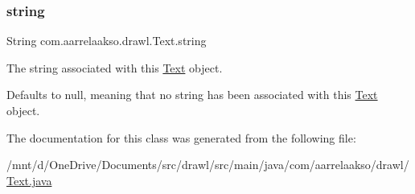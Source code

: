 \subsubsection{\texorpdfstring{string}{string}}
{\footnotesize\ttfamily String com.\+aarrelaakso.\+drawl.\+Text.\+string\hspace{0.3cm}{\ttfamily [private]}}



The string associated with this \hyperlink{classcom_1_1aarrelaakso_1_1drawl_1_1_text}{Text} object. 

Defaults to {\ttfamily null}, meaning that no string has been associated with this \hyperlink{classcom_1_1aarrelaakso_1_1drawl_1_1_text}{Text} object. 

The documentation for this class was generated from the following file\+:\begin{DoxyCompactItemize}
\item 
/mnt/d/\+One\+Drive/\+Documents/src/drawl/src/main/java/com/aarrelaakso/drawl/\hyperlink{_text_8java}{Text.\+java}\end{DoxyCompactItemize}
